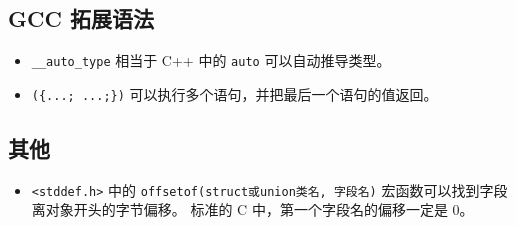 \subsection{GCC 拓展语法}
\begin{itemize}
\item \verb`__auto_type` 相当于 C++ 中的 \verb`auto` 可以自动推导类型。
\item \verb`({...; ...;})` 可以执行多个语句，并把最后一个语句的值返回。
\end{itemize}

\subsection{其他}
\begin{itemize}
\item \verb`<stddef.h>` 中的 \verb`offsetof(struct或union类名, 字段名)` 宏函数可以找到字段离对象开头的字节偏移。 标准的 C 中，第一个字段名的偏移一定是 0。
\end{itemize}
